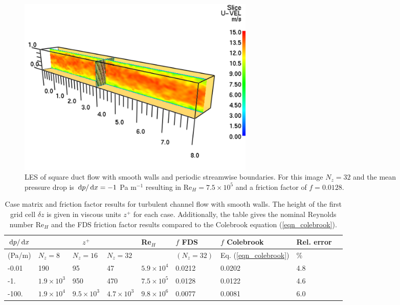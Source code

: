 \documentclass[11pt]{book}
\begin{document}
\begin{figure}
\centering
\includegraphics[width=4.5in]{FIGURES/channel_flow_setup}
\caption[LES of square duct flow]{LES of square duct flow with smooth walls and periodic streamwise boundaries.  For this image $N_z=32$ and the mean pressure drop is $\,\mathrm{d} p/ \,\mathrm{d} x = -1$ Pa m$^{-1}$ resulting in Re$_H = 7.5\times 10^5$ and a friction factor of $f=0.0128$.}
\label{fig_channel_flow_setup}
\end{figure}

\begin{table}
\centering
\caption[Case matrix for Moody chart]{Case matrix and friction factor results for turbulent channel flow with smooth walls. The height of the first grid cell $\delta z$ is given in viscous units $z^+$ for each case.  Additionally, the table gives the nominal Reynolds number Re$_H$ and the FDS friction factor results compared to the Colebrook equation (\ref{eqn_colebrook}).}
\begin{tabular}{|*{9}{l|}}
\hline
$\,\mathrm{d} p/\,\mathrm{d} x$   & \multicolumn{3}{c|}{$z^+$} &  Re$_H$  & $f$ FDS  & $f$ Colebrook & Rel. error \\
\hline (Pa/m)           & $N_z=8$          & $N_z=16$          & $N_z=32$          &                   & $(N_z=32)$ & Eq. (\ref{eqn_colebrook}) & \% \\
\hline\hline -0.01      & 190              & 95                & 47                & $5.9\times 10^4$  & 0.0212     & 0.0202   & 4.8                 \\
\hline -1.    & $1.9\times 10^3$ & 950               & 470               & $7.5\times 10^5$  & 0.0128     & 0.0122   & 4.6                 \\
\hline -100.  & $1.9\times 10^4$ & $9.5\times 10^3$  & $4.7\times 10^3$  & $9.8\times 10^6$  & 0.0077     & 0.0081   & 6.0                 \\
\hline
\end{tabular}
\label{tab_zplus}
\end{table}
\end{document}
